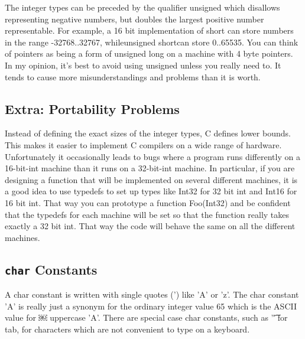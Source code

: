
The integer types can be preceded by the qualifier unsigned which disallows representing negative numbers, but doubles the largest positive number representable. For example, a 16 bit implementation of short can store numbers in the range -32768..32767, whileunsigned shortcan store 0..65535. You can think of pointers as being a form of unsigned long on a machine with 4 byte pointers. In my opinion, it's best to avoid using unsigned unless you really need to. It tends to cause more misunderstandings and problems than it is worth.

\subsection{Extra: Portability Problems}

Instead of defining the exact sizes of the integer types, C defines lower bounds. This makes it easier to implement C compilers on a wide range of hardware. Unfortunately it occasionally leads to bugs where a program runs differently on a 16-bit-int machine than it runs on a 32-bit-int machine. In particular, if you are designing a function that will be implemented on several different machines, it is a good idea to use typedefs to set up types like Int32 for 32 bit int and Int16 for 16 bit int. That way you can prototype a function Foo(Int32) and be confident that the typedefs for each machine will be set so that the function really takes exactly a 32 bit int. That way the code will behave the same on all the different machines.

\subsection{\lstinline{char} Constants}

A char constant is written with single quotes (') like 'A' or 'z'. The char constant 'A' is really just a synonym for the ordinary integer value 65 which is the ASCII value for ￼ uppercase 'A'. There are special case char constants, such as '\t' for tab, for characters which are not convenient to type on a keyboard.

